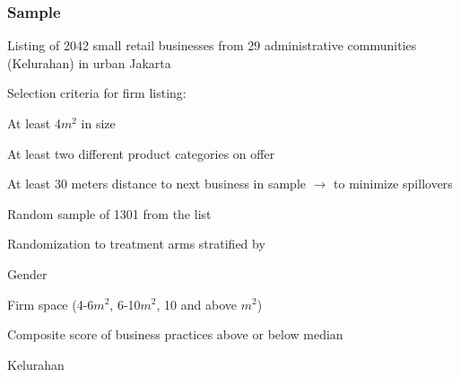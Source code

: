 \documentclass[hideothersubsections, usenames,dvipsnames,11pt]{beamer}
\newenvironment{itemize_3pt}{\itemize\addtolength{\itemsep}{3pt}}{\enditemize}
\begin{document}
\begin{frame}
\frametitle{Sample}
\begin{itemize_3pt}
\item Listing of 2042 small retail businesses from 29 administrative communities (Kelurahan) in urban Jakarta
\item Selection criteria for firm listing:
	\begin{itemize_3pt}
	\item At least 4$m^{2}$ in size
	\item At least two different product categories on offer
	\item At least 30 meters distance to next business in sample $\rightarrow$ to minimize spillovers
	\end{itemize_3pt}
\item Random sample of 1301 from the list
\item Randomization to treatment arms stratified by
	\begin{itemize_3pt}
	\item Gender
	\item Firm space (4-6$m^2$, 6-10$m^2$, 10 and above $m^2$)
	\item Composite score of business practices above or below median
	\item Kelurahan
	\end{itemize_3pt}
\end{itemize_3pt}
\end{frame}
\end{document}
